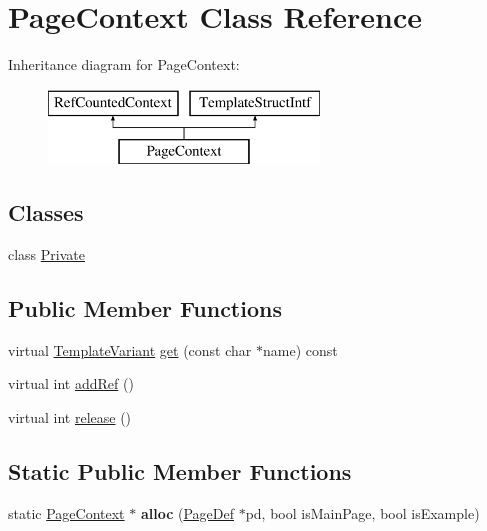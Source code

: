 \hypertarget{class_page_context}{}\section{Page\+Context Class Reference}
\label{class_page_context}
Inheritance diagram for Page\+Context\+:\begin{figure}[H]
\begin{center}
\leavevmode
\includegraphics[height=2.000000cm]{class_page_context}
\end{center}
\end{figure}
\subsection*{Classes}
\begin{DoxyCompactItemize}
\item 
class \mbox{\hyperlink{class_page_context_1_1_private}{Private}}
\end{DoxyCompactItemize}
\subsection*{Public Member Functions}
\begin{DoxyCompactItemize}
\item 
virtual \mbox{\hyperlink{class_template_variant}{Template\+Variant}} \mbox{\hyperlink{class_page_context_a777fceafe3c64f051a6cf2fdc3b69390}{get}} (const char $\ast$name) const
\item 
virtual int \mbox{\hyperlink{class_page_context_a70ce0b0a5fb9f2899053fddc2543f823}{add\+Ref}} ()
\item 
virtual int \mbox{\hyperlink{class_page_context_a7606be03a79df97def92c6bde9383f3c}{release}} ()
\end{DoxyCompactItemize}
\subsection*{Static Public Member Functions}
\begin{DoxyCompactItemize}
\item 
\mbox{\label{class_page_context_a90d0e4a57a4fc1982e9b1c002d3d045e}} 
static \mbox{\hyperlink{class_page_context}{Page\+Context}} $\ast$ {\bfseries alloc} (\mbox{\hyperlink{class_page_def}{Page\+Def}} $\ast$pd, bool is\+Main\+Page, bool is\+Example)
\end{DoxyCompactItemize}


